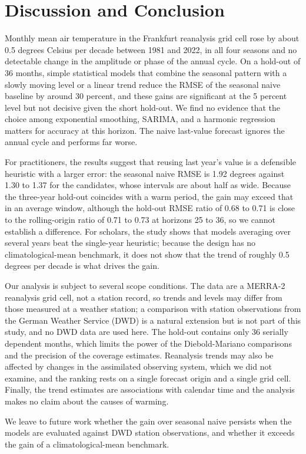 \documentclass[11pt]{article}
\begin{document}
\section{Discussion and Conclusion}

Monthly mean air temperature in the Frankfurt reanalysis grid cell rose by about 0.5 degrees Celsius per decade between 1981 and 2022, in all four seasons and no detectable change in the amplitude or phase of the annual cycle. On a hold-out of 36 months, simple statistical models that combine the seasonal pattern with a slowly moving level or a linear trend reduce the RMSE of the seasonal naive baseline by around 30 percent, and these gains are significant at the 5 percent level but not decisive given the short hold-out. We find no evidence that the choice among exponential smoothing, SARIMA, and a harmonic regression matters for accuracy at this horizon. The naive last-value forecast ignores the annual cycle and performs far worse.

For practitioners, the results suggest that reusing last year's value is a defensible heuristic with a larger error: the seasonal naive RMSE is 1.92 degrees against 1.30 to 1.37 for the candidates, whose intervals are about half as wide. Because the three-year hold-out coincides with a warm period, the gain may exceed that in an average window, although the hold-out RMSE ratio of 0.68 to 0.71 is close to the rolling-origin ratio of 0.71 to 0.73 at horizons 25 to 36, so we cannot establish a difference. For scholars, the study shows that models averaging over several years beat the single-year heuristic; because the design has no climatological-mean benchmark, it does not show that the trend of roughly 0.5 degrees per decade is what drives the gain.

Our analysis is subject to several scope conditions. The data are a MERRA-2 reanalysis grid cell, not a station record, so trends and levels may differ from those measured at a weather station; a comparison with station observations from the German Weather Service (DWD) is a natural extension but is not part of this study, and no DWD data are used here. The hold-out contains only 36 serially dependent months, which limits the power of the Diebold-Mariano comparisons and the precision of the coverage estimates. Reanalysis trends may also be affected by changes in the assimilated observing system, which we did not examine, and the ranking rests on a single forecast origin and a single grid cell. Finally, the trend estimates are associations with calendar time and the analysis makes no claim about the causes of warming.

We leave to future work whether the gain over seasonal naive persists when the models are evaluated against DWD station observations, and whether it exceeds the gain of a climatological-mean benchmark.



\end{document}
